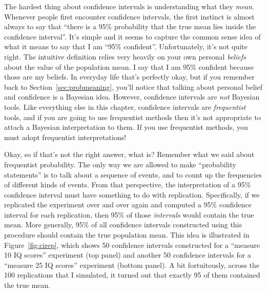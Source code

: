 The hardest thing about confidence intervals is understanding what they {\it mean}. Whenever people first encounter confidence intervals, the first instinct is almost always to say that ``there is a 95\% probability that the true mean lies inside the confidence interval''. It's simple and it seems to capture the common sense idea of what it means to say that I am ``95\% confident''. Unfortunately, it's not quite right. The intuitive definition relies very heavily on your own personal {\it beliefs} about the value of the population mean. I say that I am 95\% confident because those are my beliefs. In everyday life that's perfectly okay, but if you remember back to Section~\ref{sec:probmeaning}, you'll notice that talking about personal belief and confidence is a Bayesian idea. However, confidence intervals are {\it not} Bayesian tools. Like everything else in this chapter, confidence intervals are {\it frequentist} tools, and if you are going to use frequentist methods then it's not appropriate to attach a Bayesian interpretation to them. If you use frequentist methods, you must adopt frequentist interpretations!

Okay, so if that's not the right answer, what is? Remember what we said about frequentist probability. The only way we are allowed to make ``probability statements'' is to talk about a sequence of events, and to count up the frequencies of different kinds of events. From that perspective, the interpretation of a 95\% confidence interval must have something to do with replication. Specifically, if we replicated the experiment over and over again and computed a 95\% confidence interval for each replication, then 95\% of those {\it intervals} would contain the true mean. More generally, 95\% of all confidence intervals constructed using this procedure should contain the true population mean. This idea is illustrated in Figure~\ref{fig:cirep}, which shows 50 confidence intervals constructed for a ``measure 10 IQ scores'' experiment (top panel) and another 50 confidence intervals for a ``measure 25 IQ scores'' experiment (bottom panel). A bit fortuitously, across the 100 replications that I simulated, it turned out that exactly 95 of them contained the true mean. 

